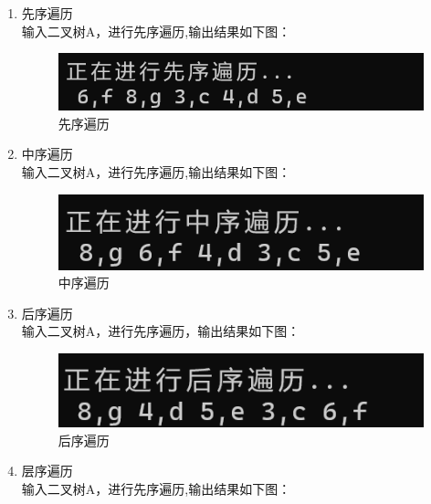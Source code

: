 \documentclass[supercite]{Experimental_Report}
\theoremstyle{definition}
\begin{document}
\begin{enumerate}
		\newpage
	\item 先序遍历\\
		输入二叉树A，进行先序遍历,输出结果如下图：
	\begin{figure}[htbp]
		\centering
		\begin{minipage}{0.7\linewidth}
			\centering
			\includegraphics[width=0.9\linewidth]{images/先序遍历.png}
		\end{minipage}
		\caption{先序遍历}
		\label{fig2-20}
  \end{figure}
	\item 中序遍历\\
		输入二叉树A，进行先序遍历,输出结果如下图：
\begin{figure}[htbp]
	\centering
	\begin{minipage}{0.7\linewidth}
		\centering
		\includegraphics[width=0.9\linewidth]{images/中序遍历.png}
	\end{minipage}
	\caption{中序遍历}
	\label{fig2-21}
  \end{figure}
		\newpage
	\item 后序遍历\\
			输入二叉树A，进行先序遍历，输出结果如下图：
	\begin{figure}[htbp]
		\centering
		\begin{minipage}{0.7\linewidth}
			\centering
			\includegraphics[width=0.9\linewidth]{images/后序遍历.png}
		\end{minipage}
		\caption{后序遍历}
		\label{fig2-22}
	  \end{figure}
	\item 层序遍历\\
	输入二叉树A，进行先序遍历,输出结果如下图：
	\begin{figure}[htbp]

\end{figure}
\end{enumerate}
\end{document}
